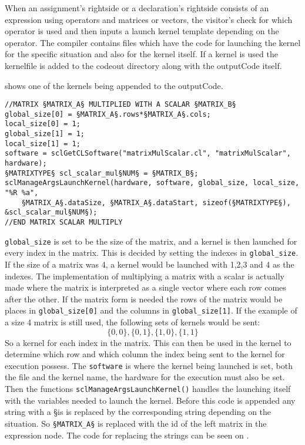When an assignment's rightside or a declaration's rightside consists of an expression using operators and matrices or vectors, the visitor's check for which operator is used and then inputs a launch kernel template depending on the operator.
The compiler contains files which have the code for launching the kernel for the specific situation and also for the kernel itself.
If a kernel is used the kernelfile is added to the codeout directory along with the outputCode itself.

 shows one of the kernels being appended to the outputCode.

\begin{lstlisting}[caption=SimpleOpenCL launch of a kernel calculating a matrix or vector multiplied with a scalar.,numbers=none,frame=tlrb,label={lst:kernelLaunch}]
//MATRIX §MATRIX_A§ MULTIPLIED WITH A SCALAR §MATRIX_B§
global_size[0] = §MATRIX_A§.rows*§MATRIX_A§.cols;
local_size[0] = 1;
global_size[1] = 1;
local_size[1] = 1;
software = sclGetCLSoftware("matrixMulScalar.cl", "matrixMulScalar", hardware);
§MATRIXTYPE§ scl_scalar_mul§NUM§ = §MATRIX_B§;
sclManageArgsLaunchKernel(hardware, software, global_size, local_size, "%R %a",
    §MATRIX_A§.dataSize, §MATRIX_A§.dataStart, sizeof(§MATRIXTYPE§), &scl_scalar_mul§NUM§);
//END MATRIX SCALAR MULTIPLY
\end{lstlisting}

\texttt{global\_size} is set to be the size of the matrix, and a kernel is then launched for every index in the matrix.
This is decided by setting the indexes in \texttt{global\_size}.
If the size of a matrix was 4, a kernel would be launched with 1,2,3 and 4 as the indexes.
The implementation of multiplying a matrix with a scalar is actually made where the matrix is interpreted as a single vector where each row comes after the other.
If the matrix form is needed the rows of the matrix would be places in \texttt{global\_size[0]} and the columns in \texttt{global\_size[1]}.
If the example of a size 4 matrix is still used, the following sets of kernels would be sent:
\begin{equation}
\{0,0\}, \{0,1\}, \{1,0\}, \{1,1\}
\end{equation}
So a kernel for each index in the matrix.
This can then be used in the kernel to determine which row and which column the index being sent to the kernel for execution possess.
The \texttt{software} is where the kernel being launched is set, both the file and the kernel name, the hardware for the execution must also be set.
Then the functions \texttt{sclManageArgsLaunchKernel()} handles the launching itself with the variables needed to launch the kernel.
Before this code is appended any string with a \S is is replaced by the corresponding string depending on the situation.
So \texttt{§MATRIX\_A§} is replaced with the id of the left matrix in the expression node.
The code for replacing the strings can be seen on .

